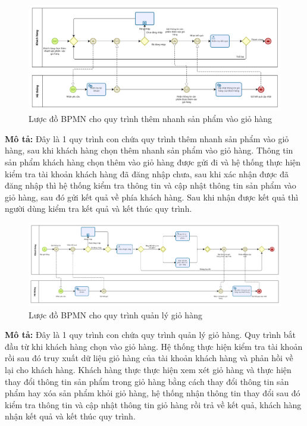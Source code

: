     \begin{figure}[!htp]
        \centering
        \includegraphics[width=15cm]{img/BPMN/customer_buy/customer_add_fast.png}
        \newline
        \caption{Lược đồ BPMN cho quy trình thêm nhanh sản phẩm vào giỏ hàng}
    \end{figure}
    \textbf{Mô tả:} Đây là 1 quy trình con chứa quy trình thêm nhanh sản phẩm vào giỏ hàng, sau khi khách hàng chọn thêm nhanh sản phẩm vào giỏ hàng. Thông tin sản phẩm khách hàng chọn thêm vào giỏ hàng được gửi đi và hệ thống thực hiện kiểm tra tài khoản khách hàng đã đăng nhập chưa, sau khi xác nhận được đã đăng nhập thì hệ thống kiểm tra thông tin và cập nhật thông tin sản phẩm vào giỏ hàng, sau đó gửi kết quả về phía khách hàng. Sau khi nhận được kết quả thì người dùng kiểm tra kết quả và kết thúc quy trình.
 
    \begin{figure}[!htp]
        \centering
        \includegraphics[width=15cm]{img/BPMN/customer_buy/customer_cart.png}
        \newline
        \caption{Lược đồ BPMN cho quy trình quản lý giỏ hàng}
    \end{figure}
    \textbf{Mô tả:} Đây là 1 quy trình con chứa quy trình quản lý giỏ hàng. Quy trình bắt đầu từ khi khách hàng chọn vào giỏ hàng. Hệ thống thực hiện kiểm tra tài khoản rồi sau đó truy xuất dữ liệu giỏ hàng của tài khoản khách hàng và phản hồi về lại cho khách hàng. Khách hàng thực thực hiện xem xét giỏ hàng và thực hiện thay đổi thông tin sản phẩm trong giỏ hàng bằng cách thay đổi thông tin sản phẩm hay xóa sản phẩm khỏi giỏ hàng, hệ thống nhận thông tin thay đổi sau đó kiểm tra thông tin và cập nhật thông tin giỏ hàng rồi trả về kết quả, khách hàng nhận kết quả và kết thúc quy trình.
 
